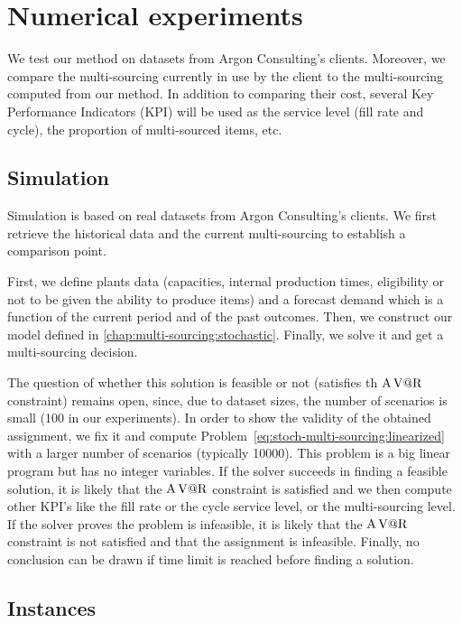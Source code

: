 \chapter{Numerical experiments}
\label{chap:multi-sourcing:numerical-experiments}


We test our method on datasets from Argon Consulting’s clients.
Moreover, we compare the multi-sourcing currently in use by the client to the multi-sourcing computed from our method.
In addition to comparing their cost, several Key Performance Indicators (KPI) will be used as the  service level (fill rate and cycle), the proportion of multi-sourced items, etc.


\section{Simulation}


Simulation is based on real datasets from Argon Consulting’s clients.
We first retrieve the historical data and the current multi-sourcing to establish a comparison point.


First, we define plants data (capacities, internal production times, eligibility or not to be given the ability to produce items) and a forecast demand which is a function of the current period and of the past outcomes.
Then, we construct our model defined in \cref{chap:multi-sourcing:stochastic}.
Finally, we solve it and get a multi-sourcing decision.


The question of whether this solution is feasible or not (\ie satisfies th $\operatorname{A\operatorname{V@R}}$ constraint) remains open, since, due to dataset sizes, the number of scenarios is small (100 in our experiments).
In order to show the validity of the obtained assignment, we fix it and compute Problem~\eqref{eq:stoch-multi-sourcing:linearized} with a larger number of scenarios (typically 10000).
This problem is a big linear program but has no integer variables.
If the solver succeeds in finding a feasible solution, it is likely that the $\operatorname{A\operatorname{V@R}}$ constraint is satisfied and we then compute other KPI's like the fill rate or the cycle service level, or the multi-sourcing level.
If the solver proves the problem is infeasible, it is likely that the $\operatorname{A\operatorname{V@R}}$ constraint is not satisfied and that the assignment is infeasible.
Finally, no conclusion can be drawn if time limit is reached before finding a solution.


\section{Instances}


